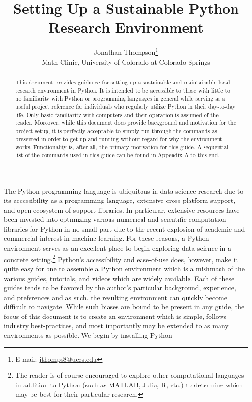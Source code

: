 \documentclass[12pt]{article}
\begin{document}
\title{Setting Up a Sustainable Python Research Environment}
\author[1]{
    Jonathan Thompson\thanks{E-mail: \url{jthomps8@uccs.edu}} \\
    Math Clinic, University of Colorado at Colorado Springs
}

\maketitle%

\begin{abstract}
\noindent This document provides guidance for setting up a sustainable and maintainable local research environment
in Python. It is intended to be accessible to those with little to no familiarity with Python or programming languages
in general while serving as a useful project reference for individuals who regularly utilize Python in their
day-to-day life. Only basic familiarity with computers and their operation is assumed of the reader. Moreover, while
this document does provide background and motivation for the project setup, it is perfectly acceptable to simply run
through the commands as presented in order to get up and running without regard for why the environment works.
Functionality is, after all, the primary motivation for this guide. A sequential list of the commands used in this guide
can be found in Appendix A to this end.

\end{abstract}


The Python programming language is ubiquitous in data science research due to its accessibility as a programming
language, extensive cross-platform support, and open ecosystem of support libraries. In particular, extensive resources
have been invested into optimizing various numerical and scientific computation libraries for Python in no small part
due to the recent explosion of academic and commercial interest in machine learning. For these reasons, a Python
environment serves as an excellent place to begin exploring data science in a concrete setting.\footnote{The reader is
of course encouraged to explore other computational languages in addition to Python (such as MATLAB, Julia, R, etc.) to
determine which may be best for their particular research.} Python's accessibility and ease-of-use does, however, make
it quite easy for one to assemble a Python environment which is a mishmash of the various guides, tutorials, and videos
which are widely available. Each of these guides tends to be flavored by the author's particular background, experience,
and preferences and as such, the resulting environment can quickly become difficult to navigate. While such biases are
bound to be present in any guide, the focus of this document is to create an environment which is simple,
follows industry best-practices, and most importantly may be extended to as many environments as possible.
We begin by installing Python.
\end{document}
